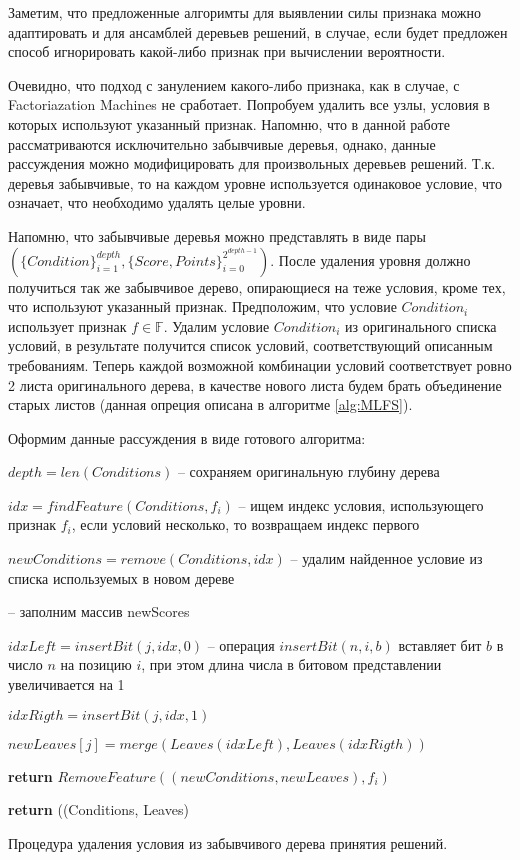 \documentclass[12pt,a4paper]{report}
\begin{document}
Заметим, что предложенные алгоримты для выявлении силы признака можно адаптировать и для ансамблей деревьев решений, в случае, если будет предложен способ игнорировать какой-либо признак при вычислении вероятности.

Очевидно, что подход с занулением какого-либо признака, как в случае, с Factoriazation Machines не сработает. Попробуем удалить все узлы, условия в которых используют указанный признак. Напомню, что в данной работе рассматриваются исключительно забывчивые деревья, однако, данные рассуждения можно модифицировать для произвольных деревьев решений. Т.к. деревья забывчивые, то на каждом уровне используется одинаковое условие, что означает, что необходимо удалять целые уровни.

Напомню, что забывчивые деревья можно представлять в виде пары \\
$(\{Condition\}_{i=1}^{depth}, \{Score, Points\}_{i=0}^{2^{depth - 1}})$. После удаления уровня должно получиться так же забывчивое дерево, опирающиеся на теже условия, кроме тех, что используют указанный признак.
Предположим, что условие $Condition_i$ использует признак $f \in \mathbb{F}$. Удалим условие  $Condition_i$ из оригинального списка условий, в результате получится список условий, соответствующий описанным требованиям. Теперь каждой возможной комбинации условий соответствует ровно 2 листа оригинального дерева, в качестве нового листа будем брать объединение старых листов (данная опреция описана в алгоритме \ref{alg:MLFS}).

Оформим данные рассуждения в виде готового алгоритма:

\begin{algorithm}[H]
\SetAlgoLined
{}
$depth = len(Conditions)$ -- сохраняем оригинальную глубину дерева

$idx = findFeature(Conditions, f_i)$ -- ищем индекс условия, использующего признак $f_i$, если условий несколько, то возвращаем индекс первого

 {
	$newConditions = remove(Conditions, idx)$ -- удалим найденное условие из списка используемых в новом дереве
	
	 { -- заполним массив newScores
	
		$idxLeft = insertBit(j, idx, 0)$ -- операция $insertBit(n, i, b)$ вставляет бит $b$ в число $n$ на позицию $i$, при этом длина числа в битовом представлении увеличивается на 1
		
		$idxRigth = insertBit(j, idx, 1)$
		
		$newLeaves[j] = merge(Leaves(idxLeft), Leaves(idxRigth))$
		
		\textbf{return} $RemoveFeature((newConditions, newLeaves), f_i)$
	}
} {
	\textbf{return} ((Conditions, Leaves)
}
\caption{Процедура удаления условия из забывчивого дерева принятия решений.}
\label{alg:ROTN}
\end{algorithm}
\end{document}
